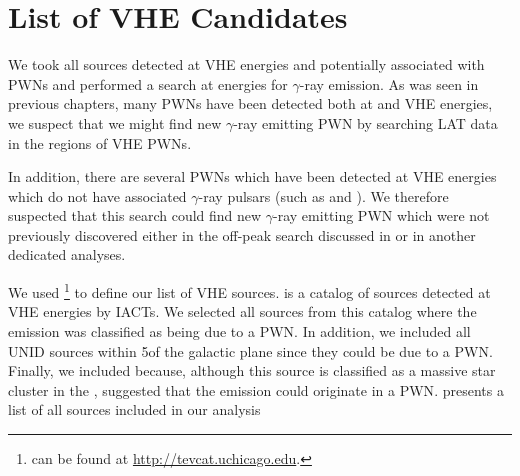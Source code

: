 \section{List of \ac{VHE}  Candidates}

We took all sources detected at \ac{VHE} energies and potentially
associated with \acp{PWN} and performed a search at \gev energies for
$\gamma$-ray emission. As was seen in previous chapters, many \acp{PWN}
have been detected both at \gev and \ac{VHE} energies, we suspect that
we might find new $\gamma$-ray emitting \ac{PWN} by searching \ac{LAT}
data in the regions of \ac{VHE} \acp{PWN}.

In addition, there are several \acp{PWN} which have been detected at
\ac{VHE} energies which do not have associated $\gamma$-ray pulsars
(such as  and ).  We therefore suspected that
this search could find new $\gamma$-ray emitting \ac{PWN} which were
not previously discovered either in the off-peak search discussed in
 or in another dedicated analyses.

We used \tevcat\footnote{\tevcat can be found at
\url{http://tevcat.uchicago.edu}.} to define our list of \ac{VHE}
sources.  \tevcat is a catalog of sources detected at \ac{VHE} energies by
\acp{IACT}. We selected all sources from this catalog where the emission
was classified as being due to a \ac{PWN}. In addition, we included
all \ac{UNID} sources within 5\degree of the galactic plane since they
could be due to a \ac{PWN}.  Finally, we included  because,
although this source is classified as a massive star cluster in the
\tevcat, \cite{de-naurois_2013a_galactic-h.e.s.s.} suggested that the
emission could originate in a \ac{PWN}.   presents
a list of all sources included in our analysis


